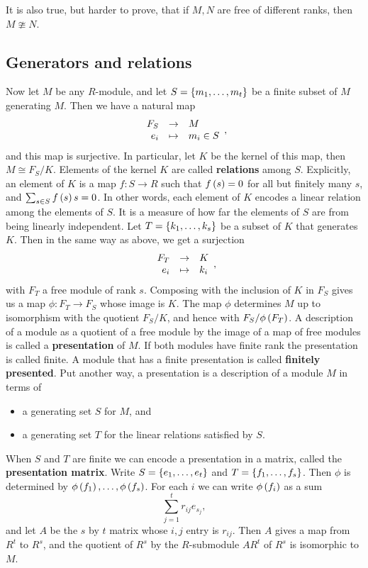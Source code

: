 \begin{note*}
It is also true, but harder to prove, that if $ M, N $ are free of different ranks, then $ M \ncong N $.
\end{note*}

\pagebreak

\subsection{Generators and relations}


Now let $ M $ be any $ R $-module, and let $ S = \left\{ m_1, \dots, m_t \right\} $ be a finite subset of $ M $ generating $ M $. Then we have a natural map
$$ \function{F_S}{M}{e_i}{m_i \in S}, $$
and this map is surjective. In particular, let $ K $ be the kernel of this map, then $ M \cong F_S / K $. Elements of the kernel $ K $ are called \textbf{relations} among $ S $. Explicitly, an element of $ K $ is a map $ f : S \to R $ such that $ f\left( s \right) = 0 $ for all but finitely many $ s $, and $ \sum_{s \in S} f\left( s \right)s = 0 $. In other words, each element of $ K $ encodes a linear relation among the elements of $ S $. It is a measure of how far the elements of $ S $ are from being linearly independent. Let $ T = \left\{ k_1, \dots, k_s \right\} $ be a subset of $ K $ that generates $ K $. Then in the same way as above, we get a surjection
$$ \function{F_T}{K}{e_i}{k_i}, $$
with $ F_T $ a free module of rank $ s $. Composing with the inclusion of $ K $ in $ F_S $ gives us a map $ \phi : F_T \to F_S $ whose image is $ K $. The map $ \phi $ determines $ M $ up to isomorphism with the quotient $ F_S / K $, and hence with $ F_S / \phi\left( F_T \right) $. A description of a module as a quotient of a free module by the image of a map of free modules is called a \textbf{presentation} of $ M $. If both modules have finite rank the presentation is called finite. A module that has a finite presentation is called \textbf{finitely presented}. Put another way, a presentation is a description of a module $ M $ in terms of
\begin{itemize}
\item a generating set $ S $ for $ M $, and
\item a generating set $ T $ for the linear relations satisfied by $ S $.
\end{itemize}
When $ S $ and $ T $ are finite we can encode a presentation in a matrix, called the \textbf{presentation matrix}. Write $ S = \left\{ e_1, \dots, e_t \right\} $ and $ T = \left\{ f_1, \dots, f_s \right\} $. Then $ \phi $ is determined by $ \phi\left( f_1 \right), \dots, \phi\left( f_s \right) $. For each $ i $ we can write $ \phi\left( f_i \right) $ as a sum
$$ \sum_{j = 1}^t r_{ij}e_{s_j}, $$
and let $ A $ be the $ s $ by $ t $ matrix whose $ i, j $ entry is $ r_{ij} $. Then $ A $ gives a map from $ R^t $ to $ R^s $, and the quotient of $ R^s $ by the $ R $-submodule $ AR^t $ of $ R^s $ is isomorphic to $ M $.

